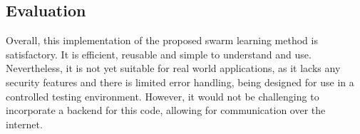 \subsection{Evaluation}
Overall, this implementation of the proposed swarm learning method is satisfactory. It is efficient, reusable and simple to understand and use. Nevertheless, it is not yet suitable for real world applications, as it lacks any security features and there is limited error handling, being designed for use in a controlled testing environment. However, it would not be challenging to incorporate a backend for this code, allowing for communication over the internet.